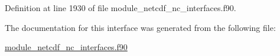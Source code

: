 Definition at line 1930 of file module\+\_\+netcdf\+\_\+nc\+\_\+interfaces.\+f90.



The documentation for this interface was generated from the following file\+:\begin{DoxyCompactItemize}
\item 
\hyperlink{module__netcdf__nc__interfaces_8f90}{module\+\_\+netcdf\+\_\+nc\+\_\+interfaces.\+f90}\end{DoxyCompactItemize}
